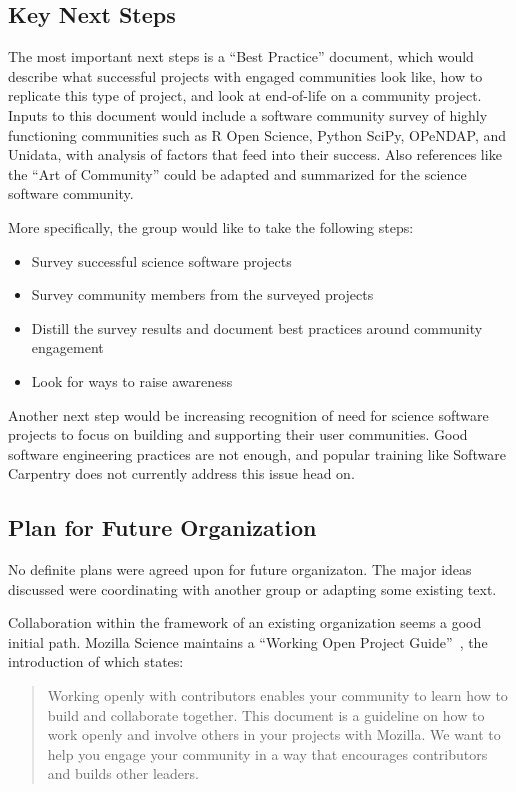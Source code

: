 \subsection{Key Next Steps}

The most important next steps is a ``Best Practice'' document, which would
describe what successful projects with engaged communities look like, how to
replicate this type of project, and look at end-of-life on a community project.
Inputs to this document would include a software community survey of highly
functioning communities such as R Open Science, Python SciPy, OPeNDAP, and
Unidata, with analysis of factors that feed into their success. Also references
like the ``Art of Community'' could be adapted and summarized for the science
software community.

More specifically, the group would like to take the following steps:

\begin{itemize}
\item Survey successful science software projects
\item Survey community members from the surveyed projects
\item Distill the survey results and document best practices around community engagement
\item Look for ways to raise awareness
\end{itemize}

Another next step would be increasing recognition of need for science software
projects to focus on building and supporting their user communities. Good software
engineering practices are not enough, and popular training like Software
Carpentry does not currently address this issue head on.

\subsection{Plan for Future Organization}

No definite plans were agreed upon for future organizaton. The major ideas discussed
were coordinating with another group or adapting some existing text.

Collaboration within the framework of an existing organization seems a good initial
path. Mozilla Science maintains a ``Working Open Project
Guide''~\cite{working-open-wssspe3}, the introduction of which states:
\begin{quote}
Working openly with contributors enables your community to learn how to build
and collaborate together. This document is a guideline on how to work openly and
involve others in your projects with Mozilla. We want to help you engage your
community in a way that encourages contributors and builds other leaders.
 \end{quote}

